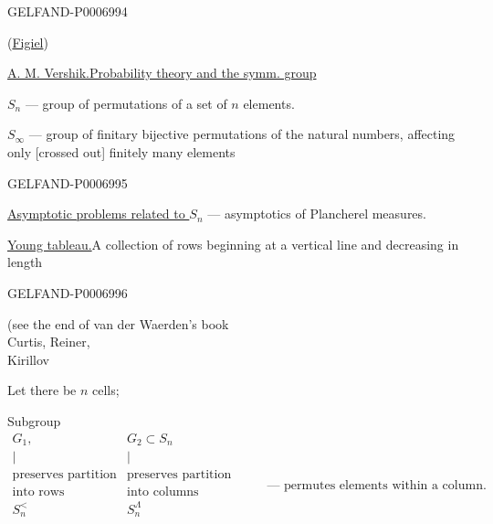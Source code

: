 \begin{GelfandAdjacentEvidence}{GELFAND-P000699}{4}


(\underline{Figiel})

\underline{A. M. Vershik.}\qquad\underline{Probability theory and the symm. group}

\(S_n\) --- group of permutations of a set of \(n\) elements.

\(S_\infty\) --- group of finitary bijective permutations of the natural numbers, affecting only [crossed out] finitely many elements
\end{GelfandAdjacentEvidence}
\begin{GelfandAdjacentEvidence}{GELFAND-P000699}{5}


\underline{Asymptotic problems related to \(S_n\)} --- asymptotics of Plancherel measures.

\underline{Young tableau.}\qquad A collection of rows beginning at a vertical line and decreasing in length

\end{GelfandAdjacentEvidence}
\begin{GelfandAdjacentEvidence}{GELFAND-P000699}{6}


(see the end of van der Waerden’s book\\
Curtis, Reiner,\\
Kirillov

Let there be \(n\) cells;

Subgroup
\[
\begin{array}{cc}
G_1,&G_2\subset S_n\\
\vert&\vert\\
\text{preserves partition}&\text{preserves partition}\\
\text{into rows}&\text{into columns}\\
S_n^{<}&S_n^\Lambda
\end{array}
\qquad
\begin{array}{l}
\\ \\ \\ \\
\text{--- permutes elements within a column.}
\end{array}
\]
\end{GelfandAdjacentEvidence}
